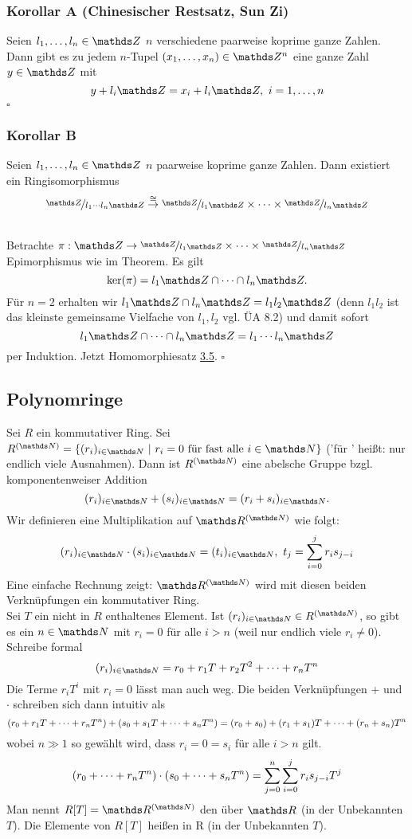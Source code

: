 \subsubsection*{Korollar A (Chinesischer Restsatz, Sun Zi)}
Seien $l_1,\dots,l_n\in\Z$ $n$ verschiedene paarweise koprime ganze Zahlen.
Dann gibt es zu jedem $n$-Tupel $(x_1,\dots,x_n)\in \Z^n$ eine ganze Zahl $y\in \Z$ mit
\[
y+l_i\Z=x_i+l_i\Z,~i=1,\dots,n
\]
\hfill $\square$

\subsubsection*{Korollar B}
Seien $l_1,\dots,l_n\in \Z$ $n$ paarweise koprime ganze Zahlen.
Dann existiert ein Ringisomorphismus
\[
\nicefrac{\Z}{l_1\cdots l_n\Z}\stackrel{\cong}{\to} \nicefrac{\Z}{l_1\Z}\times \dots \times \nicefrac{\Z}{l_n\Z}
\]

\\
Betrachte $\pi:\Z\to \nicefrac{\Z}{l_1\Z}\times \dots \times \nicefrac{\Z}{l_n\Z}$ Epimorphismus wie im Theorem.
Es gilt
\[
\ker(\pi)=l_1\Z \cap\dots\cap l_n\Z.
\]
Für $n=2$ erhalten wir $l_1\Z\cap l_n\Z=l_1l_2\Z$ (denn $l_1l_2$ ist das kleinste gemeinsame Vielfache von $l_1,l_2$ vgl. ÜA 8.2) und damit sofort
\[
l_1\Z\dt{\cap}l_n\Z=l_1\cdots l_n\Z
\]
per Induktion.
Jetzt Homomorphiesatz \hyperref[sub:homosatz_isosatz]{3.5}.
\hfill $\square$

\subsection{Polynomringe}
\label{sub:polynomringe}
Sei $R$ ein kommutativer Ring.
Sei $R^{(\N)}=\{(r_i)_{i\in \N}~|~r_i=0\text{ für fast alle }i\in \N \}$ ('für ' heißt: nur endlich viele Ausnahmen).
Dann ist $R^{(\N)}$ eine abelsche Gruppe bzgl. komponentenweiser Addition
\[
(r_i)_{i\in\N}+(s_i)_{i\in\N}=(r_i+s_i)_{i\in \N}.
\]
Wir definieren eine Multiplikation auf $\R^{(\N)}$ wie folgt:
\[
(r_i)_{i\in \N}\cdot (s_i)_{i\in \N}=(t_i)_{i\in \N},~t_j=\sum_{i=0}^jr_is_{j-i}
\]
Eine einfache Rechnung zeigt:
$\R^{(\N)}$ wird mit diesen beiden Verknüpfungen ein kommutativer Ring.\\
Sei $T$ ein nicht in $R$ enthaltenes Element.
Ist $(r_i)_{i\in \N}\in R^{(\N)}$, so gibt es ein $n\in \N$ mit $r_i=0$ für alle $i>n$ (weil nur endlich viele $r_i\neq 0$).\\
Schreibe formal
\[
(r_i)_{i\in \N}=r_0+r_1T+r_2T^2\dt{+}r_nT^n
\]
Die Terme $r_iT^i$ mit $r_i=0$ lässt man auch weg.
Die beiden Verknüpfungen + und $\cdot$ schreiben sich dann intuitiv als
\[
(r_0+r_1T+ \dots +r_nT^n)+(s_0+s_1T+ \dots +s_nT^n)=(r_0+s_0)+(r_1+s_1)T+ \dots +(r_n+s_n)T^n
\]
wobei $n\gg 1$ so gewählt wird, dass $r_i=0=s_i$ für alle $i>n$ gilt.
\[
(r_0+ \dots +r_nT^n)\cdot(s_0+ \dots +s_nT^n)=\sum_{j=0}^{n}\sum_{i=0}^{j}r_is_{j-i}T^j
\]
Man nennt $R[T]=\R^{(\N)}$ den  über $\R$ (in der Unbekannten $T$).
Die Elemente von $R[T]$ heißen  in R (in der Unbekannten $T$).


